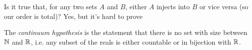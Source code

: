 \documentclass{../template/note}
\begin{document}
    \begin{remark*}
        Is it true that, for any two sets \(A\) and \(B\), either \(A\) injects into \(B\) or vice versa (so our order is total)? Yes, but it's hard to prove
    \end{remark*}
    
    \begin{remark*}
        The \emph{continuum hypothesis} is the statement that there is no set with size between \(\mathbb N\) and \(\mathbb R\), i.e. any subset of the reals is either countable or in bijection with \(\mathbb R\).
    \end{remark*}
    
    
    
    
\end{document}
